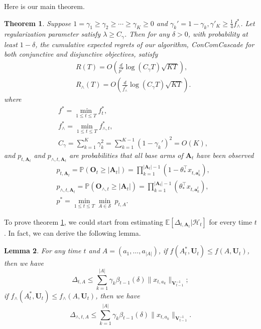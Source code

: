 \documentclass{article}
\newcommand{\EE}{\mathbb{E}}
\newcommand{\PP}{\mathbb{P}}
\newcommand{\bA}{\mathbf{A}}
\newcommand{\ba}{\mathbf{a}}
\newcommand{\bO}{\mathbf{O}}
\newcommand{\bU}{\mathbf{U}}
\newcommand{\bV}{\mathbf{V}}
\newcommand{\cH}{\mathcal{H}}
\newcommand{\cS}{\mathcal{S}}
\newcommand{\abs}[1]{\left| #1 \right|}
\newcommand{\norm}[1]{\| #1 \|}
\newtheorem{theorem}{Theorem}[section]
\newtheorem{lemma}[theorem]{Lemma}%
\begin{document}
Here is our main theorem.
\begin{theorem}
\label{thm:main}
Suppose $1 = \gamma_1 \geq \gamma_2 \geq \cdots \geq \gamma_{K} \geq 0$ and $\gamma_k' = 1 - \gamma_k, \gamma'_K \geq \frac{1}{4}f_{\wedge}^{\ast}$. Let regularization parameter satisfy $\lambda \geq C_\gamma$. Then for any $\delta > 0$, with probability at least $1 - \delta$, the cumulative expected regrets of our algorithm, {\em ConComCascade} for both conjunctive and disjunctive objectives, satisfy
\begin{align}
&R(T) = O(\frac{d}{p^*} \log(C_\gamma T) \sqrt{KT}),\\
&R_{\wedge}(T) = O(\frac{d}{f_{\wedge}^{\ast}} \log(C_\gamma T) \sqrt{KT}).
\end{align}
where
\begin{align*}
&f^* = \min_{1 \leq t \leq T} f_t^{\ast},\\
&f_{\wedge}^* = \min_{1 \leq t \leq T} f_{\wedge, t}^{\ast},\\
&C_\gamma = \sum_{k=1}^{K} \gamma_k^2 = \sum_{k=1}^{K-1} (1 - \gamma_k')^2 = O(K),
\end{align*}
and $p_{t, \bA_t}$ and $p_{\wedge, t, \bA_t}$ are probabilities that all base arms of $\bA_t$ have been observed
\begin{align*}
&p_{t, \bA_t} = \PP(\bO_t \geq \abs{\bA_t}) = \prod_{k=1}^{\abs{\bA_t}-1} (1 - \theta_{\ast}^{\top} x_{t, \ba_k^t}),\\
&p_{\wedge, t, \bA_t} = \PP(\bO_{\wedge, t} \geq \abs{\bA_t}) = \prod_{k=1}^{\abs{\bA_t}-1} (\theta_{\ast}^{\top} x_{t, \ba_k^t}),\\
&p^* = \min_{1 \leq t \leq T} \min_{A \in \cS} ~ p_{t, A}.
\end{align*}
\end{theorem}

To prove theorem \ref{thm:main}, we could start from estimating $\EE[\Delta_{t, \bA_t}|\cH_t]$ for every time $t$. In fact, we can derive the following lemma.
\begin{lemma}
\label{lem:DeltaEstimate}
For any time $t$ and $A = (a_1, \ldots, a_{\abs{A}})$, if $f(A_t^*, \bU_t) \leq f(A, \bU_t)$, then we have
$$
\Delta_{t,A} \leq \sum_{k=1}^{\abs{A}} \gamma_k \beta_{t-1}(\delta)\norm{x_{t,a_k}}_{\bV_{t-1}^{-1}};
$$
if $f_{\wedge}(A_t^*, \bU_t) \leq f_{\wedge}(A, \bU_t)$, then we have
$$
\Delta_{\wedge, t,A} \leq \sum_{k=1}^{\abs{A}} \gamma_k \beta_{t-1}(\delta)\norm{x_{t,a_k}}_{\bV_{t-1}^{-1}}.
$$
\end{lemma}
\end{document}
